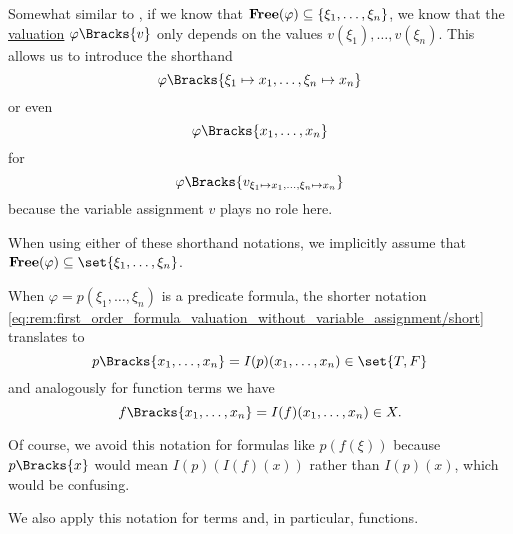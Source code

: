 \begin{remark}\label{rem:first_order_formula_valuation_without_variable_assignment}
  Somewhat similar to , if we know that \( \operatorname{\mathbf{Free}}(\varphi) \subseteq \{ \xi_1, \ldots, \xi_n \} \), we know that the \hyperref[def:first_order_valuation/formula_valuation]{valuation} \( \varphi\Bracks{v} \) only depends on the values \( v(\xi_1), \ldots, v(\xi_n) \). This allows us to introduce the shorthand
  \begin{equation}\label{eq:rem:first_order_formula_valuation_without_variable_assignment/long}
    \varphi\Bracks{\xi_1 \mapsto x_1, \ldots, \xi_n \mapsto x_n}
  \end{equation}
  or even
  \begin{equation}\label{eq:rem:first_order_formula_valuation_without_variable_assignment/short}
    \varphi\Bracks{x_1, \ldots, x_n}
  \end{equation}
  for
  \begin{equation*}
    \varphi\Bracks{v_{\xi_1 \mapsto x_1, \ldots, \xi_n \mapsto x_n}}
  \end{equation*}
  because the variable assignment \( v \) plays no role here.

  When using either of these shorthand notations, we implicitly assume that \( \boldop{Free}(\varphi) \subseteq \set{ \xi_1, \ldots, \xi_n } \).

  When \( \varphi = p(\xi_1, \ldots, \xi_n) \) is a predicate formula, the shorter notation \eqref{eq:rem:first_order_formula_valuation_without_variable_assignment/short} translates to
  \begin{equation*}
    p\Bracks{x_1, \ldots, x_n} = I(p)(x_1, \ldots, x_n) \in \set{ T, F }
  \end{equation*}
  and analogously for function terms we have
  \begin{equation*}
    f\Bracks{x_1, \ldots, x_n} = I(f)(x_1, \ldots, x_n) \in X.
  \end{equation*}

  Of course, we avoid this notation for formulas like \( p(f(\xi)) \) because \( p\Bracks{x} \) would mean \( I(p)(I(f)(x)) \) rather than \( I(p)(x) \), which would be confusing.

  We also apply this notation for terms and, in particular, functions.
\end{remark}

